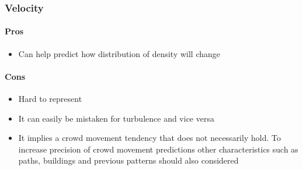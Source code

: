 \subsubsection{Velocity}


\paragraph{Pros}
\begin{itemize}
    \item Can help predict how distribution of density will change
\end{itemize}

\paragraph{Cons}
\begin{itemize}
    \item Hard to represent
    \item It can easily be mistaken for turbulence and vice versa
    \item It implies a crowd movement tendency that does not necessarily hold. To increase precision of crowd movement predictions other characteristics such as paths, buildings and previous patterns should also considered
\end{itemize}


